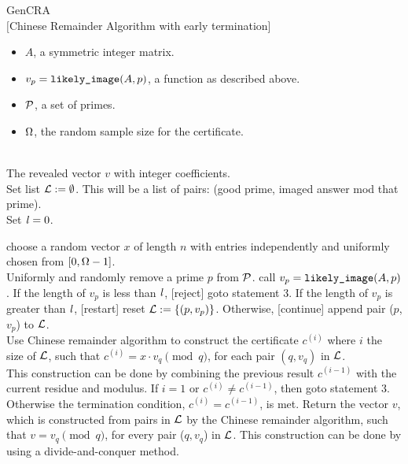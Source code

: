 \begin{algorithm} {GenCRA}\\
$[$Chinese Remainder Algorithm with early termination] 
\Inspec
\begin{itemize}
\item
  $A$, a symmetric integer matrix.
\item
  $v_p = \mbox{\tt likely\_image}(A, p)$, a function as described above.
\item
  $\mathcal P$, a set of primes.
\item
  $\Omega$, the random sample size for the certificate.
\end{itemize}
\Outspec\\
The revealed vector $v$ with integer coefficients. \\
\Stmt[1.]
Set list $\mathcal L := \emptyset$.  This will be a list of pairs: (good prime, imaged answer
 mod that prime).\\
Set $\mathit l = 0$.

\Stmt[2.]
choose a random vector $x$ of length $n$ with
entries independently and uniformly chosen 
from $[0, \Omega - 1]$.\\
\Stmt[3.]
Uniformly and randomly remove a prime $p$ from $\mathcal P$.
\Stmt[4.]
call $v_p = \mbox{\tt likely\_image}(A, p)$. 
If the length of $v_p$ is less than $\mathit l$, [reject] goto statement 3.
If the length of $v_p$ is greater than $\mathit l$, [restart] reset $\mathcal L := \{(p, v_p)\}$.
Otherwise, [continue] append pair ($p$, $v_p$) to $\mathcal L$.\\
\Stmt[5.]
Use Chinese remainder algorithm to construct 
the certificate $c^{(i)}$ where $i$ the size of $\mathcal L$, such that
$c^{(i)} = x \cdot v_{q} \pmod {q}$, for each pair $(q, v_q)$ in $\mathcal L$.\\
This construction can be done by combining the previous result $c^{(i-1)}$ 
with the current residue and modulus.
\Stmt[6.]
If $i = 1$ or $c^{(i)} \not= c^{(i-1)}$, then goto statement 3.\\
Otherwise the termination condition, $c^{(i)} = c^{(i-1)}$,
is met.
Return the vector $v$, which is
constructed from pairs in $\mathcal L$ by the Chinese remainder algorithm,
such that $v = v_q \pmod q$, for every pair ($q, v_q$) in $\mathcal L$.
This construction can be done by using a divide-and-conquer method. 
\end{algorithm}

